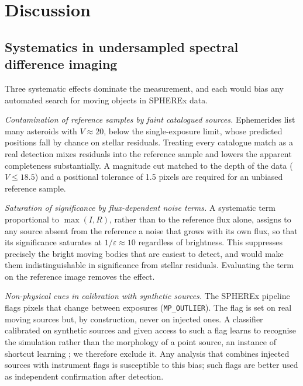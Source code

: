 \documentclass[twocolumn,linenumbers,anonymous]{aastex702}
\begin{document}
\section{Discussion}\label{sec:discussion}

\subsection{Systematics in undersampled spectral difference imaging}\label{sec:sys}
Three systematic effects dominate the measurement, and each would bias any automated search for moving objects in SPHEREx data.

\emph{Contamination of reference samples by faint catalogued sources.} Ephemerides list many asteroids with $V \approx 20$, below the single-exposure limit, whose predicted positions fall by chance on stellar residuals. Treating every catalogue match as a real detection mixes residuals into the reference sample and lowers the apparent completeness substantially. A magnitude cut matched to the depth of the data ($V \le 18.5$) and a positional tolerance of 1.5 pixels are required for an unbiased reference sample.

\emph{Saturation of significance by flux-dependent noise terms.} A systematic term proportional to $\max(I, R)$, rather than to the reference flux alone, assigns to any source absent from the reference a noise that grows with its own flux, so that its significance saturates at $1/\varepsilon \approx 10$ regardless of brightness. This suppresses precisely the bright moving bodies that are easiest to detect, and would make them indistinguishable in significance from stellar residuals. Evaluating the term on the reference image removes the effect.

\emph{Non-physical cues in calibration with synthetic sources.} The SPHEREx pipeline flags pixels that change between exposures (\texttt{MP\_OUTLIER}). The flag is set on real moving sources but, by construction, never on injected ones. A classifier calibrated on synthetic sources and given access to such a flag learns to recognise the simulation rather than the morphology of a point source, an instance of shortcut learning \citep{geirhos20}; we therefore exclude it. Any analysis that combines injected sources with instrument flags is susceptible to this bias; such flags are better used as independent confirmation after detection.
\end{document}
